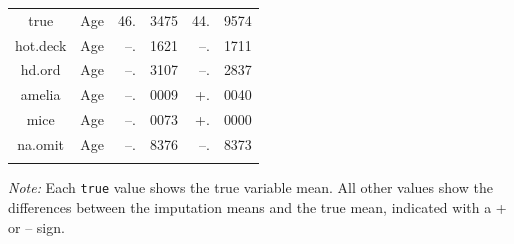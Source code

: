 \documentclass[12pt,econ]{sources/authesis}
\begin{document}
\begin{table}[H]
\begin{threeparttable}
\begin{tabular}{ccr@{}lr@{}l}
 true & Age & 46.&3475 & 44.&9574 \\
 hot.deck & Age & --.&1621 & --.&1711 \\ 
 hd.ord & Age & --.&3107 & --.&2837 \\
 amelia & Age & --.&0009 & +.&0040 \\
 mice & Age & --.&0073 & +.&0000 \\ 
 na.omit & Age & --.&8376 & --.&8373 \\
 \hline \\[-1.8ex] 
\end{tabular} 
\begin{tablenotes}
\footnotesize{\textit{Note:} Each \texttt{true} value shows the true variable mean. All other values show the differences between the imputation means and the true mean, indicated with a + or -- sign.}
\end{tablenotes}
\end{threeparttable}
\end{table}
\end{document}
